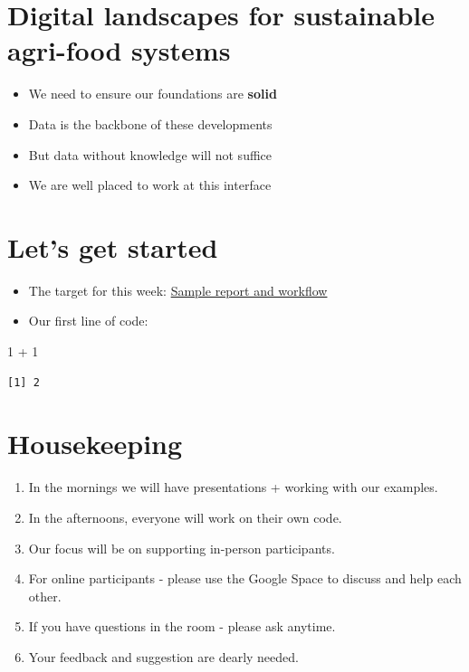 \documentclass[
  letterpaper,
  DIV=11,
  numbers=noendperiod]{scrreprt}
\newenvironment{Shaded}{\begin{snugshade}}{\end{snugshade}}
\newcommand{\DecValTok}[1]{\textcolor[rgb]{0.68,0.00,0.00}{#1}}
\newcommand{\SpecialCharTok}[1]{\textcolor[rgb]{0.37,0.37,0.37}{#1}}
\providecommand{\tightlist}{%
  \setlength{\itemsep}{0pt}\setlength{\parskip}{0pt}}\usepackage{longtable,booktabs,array}
\begin{document}
\hypertarget{digital-landscapes-for-sustainable-agri-food-systems}{%
\section{Digital landscapes for sustainable agri-food
systems}\label{digital-landscapes-for-sustainable-agri-food-systems}}

\begin{itemize}
\item
  We need to ensure our foundations are \textbf{solid}
\item
  Data is the backbone of these developments
\item
  But data without knowledge will not suffice
\item
  We are well placed to work at this interface
\end{itemize}

\hypertarget{lets-get-started}{%
\section{Let's get started}\label{lets-get-started}}

\begin{itemize}
\item
  The target for this week:
  \href{https://systems-agronomy.github.io/lcas/toolbox/show_report}{Sample
  report and workflow}
\item
  Our first line of code:
\end{itemize}

\begin{Shaded}
\begin{Highlighting}[]
\DecValTok{1} \SpecialCharTok{+} \DecValTok{1}
\end{Highlighting}
\end{Shaded}

\begin{verbatim}
[1] 2
\end{verbatim}

\hypertarget{housekeeping}{%
\section{Housekeeping}\label{housekeeping}}

\begin{enumerate}
\def\labelenumi{\arabic{enumi}.}
\tightlist
\item
  In the mornings we will have presentations + working with our
  examples.
\item
  In the afternoons, everyone will work on their own code.
\item
  Our focus will be on supporting in-person participants.
\item
  For online participants - please use the Google Space to discuss and
  help each other.
\item
  If you have questions in the room - please ask anytime.
\item
  Your feedback and suggestion are dearly needed.
\end{enumerate}
\end{document}
